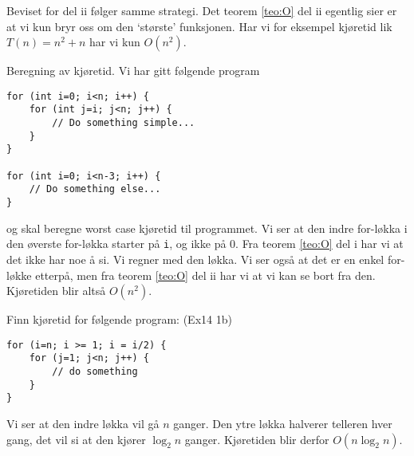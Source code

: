 Beviset for del ii følger samme strategi. Det teorem \ref{teo:O} del ii egentlig sier er at vi kun bryr oss om den `største' funksjonen. Har vi for eksempel kjøretid lik $ T(n) = n^2 + n $ har vi kun $ O(n^2) $.

\begin{eks} Beregning av kjøretid. Vi har gitt følgende program
\begin{verbatim}
for (int i=0; i<n; i++) {
    for (int j=i; j<n; j++) {
        // Do something simple...
    }
}

for (int i=0; i<n-3; i++) {
    // Do something else...
}
\end{verbatim}
og skal beregne worst case kjøretid til programmet. Vi ser at den indre for-løkka i den øverste for-løkka starter på \verb|i|, og ikke på 0. Fra teorem \ref{teo:O} del i har vi at det ikke har noe å si. Vi regner med den løkka. Vi ser også at det er en enkel for-løkke etterpå, men fra teorem \ref{teo:O} del ii har vi at vi kan se bort fra den. Kjøretiden blir altså $ O(n^2) $.
\end{eks}


\begin{eks} Finn kjøretid for følgende program: (Ex14 1b)

\begin{verbatim}
for (i=n; i >= 1; i = i/2) {
    for (j=1; j<n; j++) {
        // do something
    }
}
\end{verbatim}
Vi ser at den indre løkka vil gå $ n $ ganger. Den ytre løkka halverer telleren hver gang, det vil si at den kjører $ \log_2 n $ ganger. Kjøretiden blir derfor $ O(n\log_2 n) $.
\end{eks}

